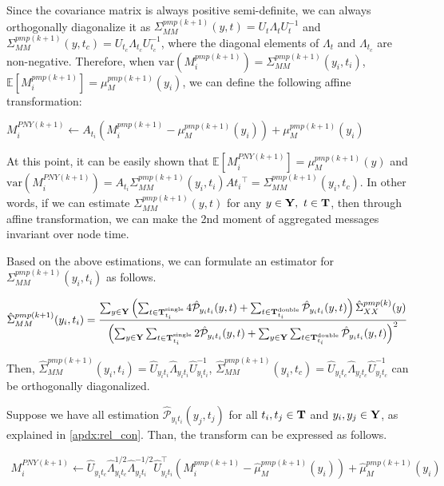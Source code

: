 Since the covariance matrix is always positive semi-definite, we can always orthogonally diagonalize it as $\Sigma^{pmp(k+1)}_{MM}(y,t)=U_t\Lambda_t U_t^{-1}$ and $\Sigma^{pmp(k+1)}_{MM}(y,t_{c})=U_{t_{c}}\Lambda_{t_{c}} U_{t_{c}}^{-1}$, where the diagonal elements of $\Lambda_{t}$ and $\Lambda_{t_{c}}$ are non-negative. Therefore, when $\text{var}(M_i^{pmp (k+1)})=\Sigma^{pmp(k+1)}_{MM}(y_i,t_i)$, $\mathbb E[M_i^{pmp(k+1)}]=\mu_M^{pmp (k+1)}({y_i})$, we can define the following affine transformation:

$M_{i}^{PNY(k+1)}\leftarrow A_{t_i} (M_i^{pmp(k+1)}-\mu_{M}^{pmp(k+1)}(y_i))+\mu_{M}^{pmp(k+1)}(y_i)$

At this point, it can be easily shown that $\mathbb{E}[M_{i}^{PNY(k+1)}]=\mu_{M}^{pmp(k+1)}(y)$ and $\text{var}(M_{i}^{PNY(k+1)})=A_{t_i}\Sigma^{pmp(k+1)}_{MM}(y_i,t_i)A{t_i}^{\top} = \Sigma^{pmp(k+1)}_{MM}(y_i,t_{c})$. In other words, if we can estimate $\Sigma^{pmp(k+1)}_{MM}(y,t)$ for any $y\in \bold{Y}, \ t\in \bold{T}$, then through affine transformation, we can make the 2nd moment of aggregated messages invariant over node time.


Based on the above estimations, we can formulate an estimator for ${\Sigma}_{MM}^{pmp(k+1)}(y_i, t_i)$ as follows.

\begin{align}
\hat{\Sigma}^{pmp(k+1)}_{MM}(y_i,t_i) = {\sum_{y\in \bold{Y}}\left(\sum_{t\in\bold{T}_{t_i}^{\text{single}}}4\hat{\mathcal{P}}_{y_i t_i}(y, t)+\sum_{t\in\bold{T}_{t_i}^{\text{double}}}\hat{\mathcal{P}}_{y_i t_i}(y, t)\right)\hat\Sigma_{XX}^{pmp(k)}(y)
\over
\left(\sum_{y\in \bold{Y}}\sum_{t\in\bold{T}_{t_i}^{\text{single}}}2\hat{\mathcal{P}}_{y_i t_i}(y, t)+\sum_{y\in \bold{Y}}\sum_{t\in\bold{T}_{t_i}^{\text{double}}}\hat{\mathcal{P}}_{y_i t_i}(y, t)\right)^2}
\end{align}

Then, $\hat\Sigma^{pmp(k+1)}_{MM}(y_i,t_i)=\hat U_{y_i t_i}\hat \Lambda_{y_i t_i} \hat U_{y_i t_i}^{-1}$, $\hat\Sigma^{pmp(k+1)}_{MM}(y_i,t_{c})=\hat U_{y_i t_{c}}\hat \Lambda_{y_it_{c}} \hat U_{y_it_{c}}^{-1}$ can be orthogonally diagonalized.

Suppose we have all estimation $\hat{\mathcal P}_{y_i t_i}(y_j, t_j)$ for all $t_i, t_j \in \bold{T}$ and $y_i, y_j\in \bold{Y}$, as explained in \ref{apdx:rel_con}. Than, the \PNY transform can be expressed as follows.

\begin{align}
M_i^{PNY(k+1)}\leftarrow  \hat U_{y_i t_{c}}\hat \Lambda_{y_i t_{c}}^{1/2}\hat \Lambda_{y_i t_i}^{-1/2}\hat U_{y_i t_i}^{\top}(M_i^{pmp (k+1)}-\hat\mu_{M}^{pmp(k+1)}(y_i))+\hat \mu_{M}^{pmp(k+1)}(y_i)
\end{align}

